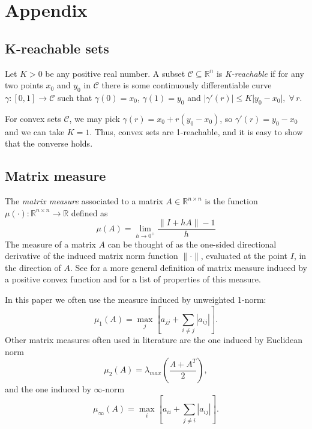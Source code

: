 \documentclass[letterpaper, 10 pt, conference]{ieeeconf}
\begin{document}
\section*{Appendix}
\subsection*{K-reachable sets}
Let $K>0$ be any positive real number. A subset $\mathcal{C}\subseteq\mathbb{R}^n$ is \emph{K-reachable} if for any two points $x_0$ and $y_0$ in $\mathcal{C}$ there is some continuously differentiable curve $\gamma:[0,1]\rightarrow\mathcal{C}$ such that $\gamma(0)=x_0$, $\gamma(1)=y_0$ and $\lvert \gamma'(r)\rvert \leq K\lvert y_0-x_0\rvert,\; \forall\, r$.

For convex sets $\mathcal{C}$, we may pick $\gamma(r)=x_0+r(y_0-x_0)$, so $\gamma'(r)=y_0-x_0$ and we can take $K=1$. Thus, convex sets are 1-reachable, and it is easy to show that the converse holds.


\subsection*{Matrix measure}
The \emph{matrix measure} \cite{vidyasagar2002nonlinear} associated to a matrix $ A \in\mathbb{R}^{n \times n}$ is the function $\mu(\cdot):\mathbb{R}^{n \times n}\rightarrow \mathbb{R}$ defined as
\begin{equation*}
\label{eq:matrix_measure}
\mu( A )=\lim_{h \rightarrow 0^+}\frac{\lVert I+h A  \rVert-1}{h}
\end{equation*}
The measure of a matrix $ A $ can be thought of as the one-sided directional derivative of the induced matrix norm function $\lVert \cdot \rVert$, evaluated at the point $I$, in the direction of $ A $. See \cite{vidyasagar1978matrix} for a more general definition of matrix measure induced by a positive convex function and \cite{vidyasagar2002nonlinear,desoer1972measure} for a list of properties of this measure.

In this paper we often use the measure induced by unweighted 1-norm:
\begin{equation*}
\label{eq:mu_1}
\mu_{1}( A )=\max_{j}\left[a_{jj}+\sum_{i\ne j}|a_{ij}|\right].
\end{equation*}
Other matrix measures often used in literature are the one induced by Euclidean norm
$$
\mu_{2}( A )=\lambda_{max}\left(\frac{ A + A^T }{2}\right),
$$ 
and the one induced by $\infty$-norm
$$
\mu_{\infty}( A )=\max_{i}\left[a_{ii}+\sum_{j\ne i}|a_{ij}|\right].
$$
\vspace{0.1cm}








 
   
\end{document}
